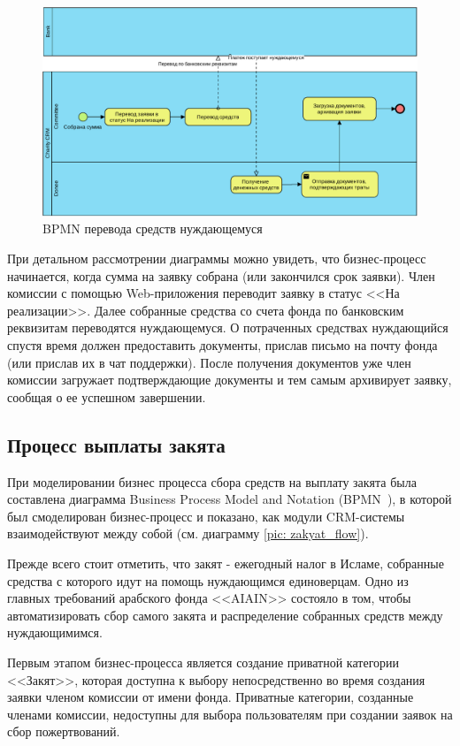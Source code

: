 \documentclass[a4paper,12pt,reqno]{article}
\begin{document}
\begin{figure}[H]
		\centering
		\includegraphics[width = \linewidth]{img/BPMN_close.pdf}
		\caption{BPMN перевода средств нуждающемуся}
		\label{pic: close_bpmn}
\end{figure}

При детальном рассмотрении диаграммы можно увидеть, что бизнес-процесс начинается, когда сумма на заявку собрана (или закончился срок заявки). Член комиссии с помощью Web-приложения переводит заявку в статус <<На реализации>>. Далее собранные средства со счета фонда по банковским реквизитам переводятся нуждающемуся. О потраченных средствах нуждающийся спустя время должен предоставить документы, прислав письмо на почту фонда (или прислав их в чат поддержки). После получения документов уже член комиссии загружает подтверждающие документы и тем самым архивирует заявку, сообщая о ее успешном завершении.

\subsection{Процесс выплаты закята}

При моделировании бизнес процесса сбора средств на выплату закята была составлена диаграмма Business Process Model and Notation (BPMN~\cite{bpmn}), в которой был смоделирован бизнес-процесс и показано, как модули CRM-системы взаимодействуют между собой (см. диаграмму \ref{pic: zakyat_flow}).

Прежде всего стоит отметить, что закят - ежегодный налог в Исламе, собранные средства с которого идут на помощь нуждающимся единоверцам. Одно из главных требований арабского фонда <<AIAIN>> состояло в том, чтобы автоматизировать сбор самого закята и распределение собранных средств между нуждающимимся. 

Первым этапом бизнес-процесса является создание приватной категории <<Закят>>, которая доступна к выбору непосредственно во время создания заявки членом комиссии от имени фонда. Приватные категории, созданные членами комиссии, недоступны для выбора пользователям при создании заявок на сбор пожертвований. 
\end{document}
